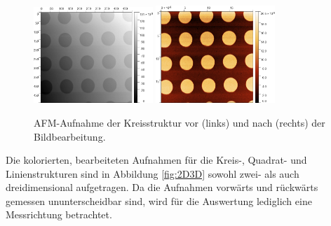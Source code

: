         \begin{figure}
            \centering
            \includegraphics[width = 0.40\textwidth]{pictures/Raw.png}
            \includegraphics[width = 0.40\textwidth]{pictures/Kreis.png}
            \caption{AFM-Aufnahme der Kreisstruktur vor (links) und nach (rechts) der Bildbearbeitung.}
            \label{fig:VorNach}
        \end{figure}
        Die kolorierten, bearbeiteten Aufnahmen für die Kreis-, Quadrat- und Linienstrukturen sind in Abbildung \ref{fig:2D3D} sowohl zwei- als auch dreidimensional aufgetragen. Da die Aufnahmen vorwärts und rückwärts gemessen ununterscheidbar sind, wird für die Auswertung lediglich eine Messrichtung betrachtet.
